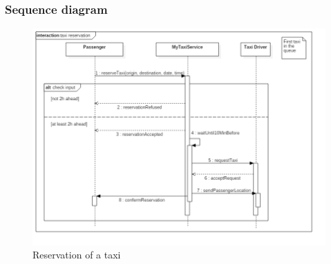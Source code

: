 \subsubsection{Sequence diagram}
\begin{figure}[H]
\centering
\includegraphics[scale=0.5]{Images/sequence_taxi_reservation}
\caption{Reservation of a taxi}
\label{reserve_taxi_SD}
\end{figure}



